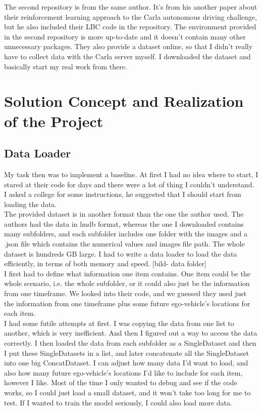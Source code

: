 \documentclass[inputenc=utf8]{ldvarticle}
\begin{document}
\noindent The second repository is from the same author. It’s from his another paper about their reinforcement learning approach to the Carla autonomous driving challenge, but he also included their LBC code in the repository. The environment provided in the second repository is more up-to-date and it doesn’t contain many other unnecessary packages. They also provide a dataset online, so that I didn’t really have to collect data with the Carla server myself. I downloaded the dataset and basically start my real work from there.

\section{Solution Concept and Realization of the Project}

\subsection{Data Loader}
My task then was to implement a baseline. At first I had no idea where to start, I stared at their code for days and there were a lot of thing I couldn’t understand. I asked a college for some instructions, he suggested that I should start from loading the data.
\\

\noindent The provided dataset is in another format than the one the author used. The authors had the data in lmdb format, whereas the one I downloaded contains many subfolders, and each subfolder includes one folder with the images and a .json file which contains the numerical values and images file path. The whole dataset is hundreds GB large. I had to write a data loader to load the data efficiently, in terms of both memory and speed.
[bild- data folder]
\\

\noindent I first had to define what information one item contains. One item could be the whole scenario, i.e. the whole subfolder, or it could also just be the information from one timeframe. We looked into their code, and we guessed they used just the information from one timeframe plus some future ego-vehicle’s locations for each item.
\\

\noindent I had some futile attempts at first. I was copying the data from one list to another, which is very inefficient. And then I figured out a way to access the data correctly. I then loaded the data from each subfolder as a SingleDataset and then I put these SingleDatasets in a list, and later concatenate all the SingleDataset into one big ConcatDataset. I can adjust how many data I’d want to load, and also how many future ego-vehicle’s locations I’d like to include for each item, however I like. Most of the time I only wanted to debug and see if the code works, so I could just load a small dataset, and it won’t take too long for me to test. If I wanted to train the model seriously, I could also load more data.
\\
\end{document}
